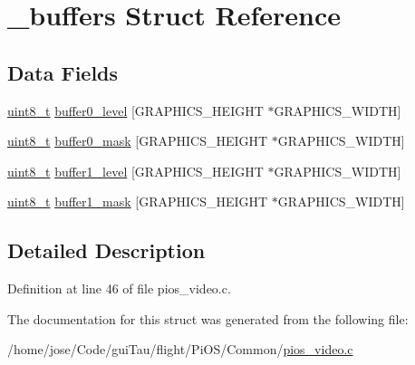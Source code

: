 \hypertarget{struct__buffers}{\section{\-\_\-buffers Struct Reference}
\label{struct__buffers}
}
\subsection*{Data Fields}
\begin{DoxyCompactItemize}
\item 
\hyperlink{stdint_8h_aba7bc1797add20fe3efdf37ced1182c5}{uint8\-\_\-t} \hyperlink{group___p_i_o_s___v_i_d_e_o_ga3b52f2bd3c15f12d7a7257c5d8ff2627}{buffer0\-\_\-level} \mbox{[}G\-R\-A\-P\-H\-I\-C\-S\-\_\-\-H\-E\-I\-G\-H\-T $\ast$G\-R\-A\-P\-H\-I\-C\-S\-\_\-\-W\-I\-D\-T\-H\mbox{]}
\item 
\hyperlink{stdint_8h_aba7bc1797add20fe3efdf37ced1182c5}{uint8\-\_\-t} \hyperlink{group___p_i_o_s___v_i_d_e_o_ga9620d63e32309e41277c6dd2dc8ee2ae}{buffer0\-\_\-mask} \mbox{[}G\-R\-A\-P\-H\-I\-C\-S\-\_\-\-H\-E\-I\-G\-H\-T $\ast$G\-R\-A\-P\-H\-I\-C\-S\-\_\-\-W\-I\-D\-T\-H\mbox{]}
\item 
\hyperlink{stdint_8h_aba7bc1797add20fe3efdf37ced1182c5}{uint8\-\_\-t} \hyperlink{group___p_i_o_s___v_i_d_e_o_ga63add1136b802684b982c920c01ae697}{buffer1\-\_\-level} \mbox{[}G\-R\-A\-P\-H\-I\-C\-S\-\_\-\-H\-E\-I\-G\-H\-T $\ast$G\-R\-A\-P\-H\-I\-C\-S\-\_\-\-W\-I\-D\-T\-H\mbox{]}
\item 
\hyperlink{stdint_8h_aba7bc1797add20fe3efdf37ced1182c5}{uint8\-\_\-t} \hyperlink{group___p_i_o_s___v_i_d_e_o_gad0338825ac9f4f66d1f1cc5147b69aa7}{buffer1\-\_\-mask} \mbox{[}G\-R\-A\-P\-H\-I\-C\-S\-\_\-\-H\-E\-I\-G\-H\-T $\ast$G\-R\-A\-P\-H\-I\-C\-S\-\_\-\-W\-I\-D\-T\-H\mbox{]}
\end{DoxyCompactItemize}


\subsection{Detailed Description}


Definition at line 46 of file pios\-\_\-video.\-c.



The documentation for this struct was generated from the following file\-:\begin{DoxyCompactItemize}
\item 
/home/jose/\-Code/gui\-Tau/flight/\-Pi\-O\-S/\-Common/\hyperlink{pios__video_8c}{pios\-\_\-video.\-c}\end{DoxyCompactItemize}
